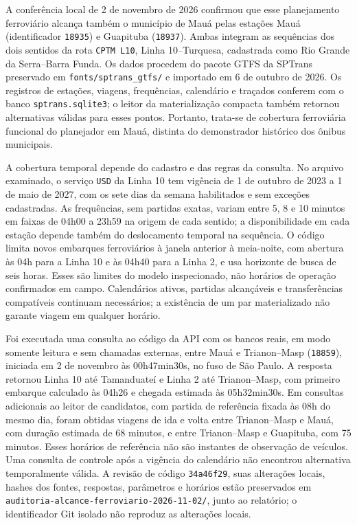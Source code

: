 \documentclass[12pt,oneside,a4paper,brazil,chapter=TITLE]{abntex2}
\begin{document}
A conferência local de 2 de novembro de 2026 confirmou que esse planejamento ferroviário alcança também o município de Mauá pelas estações Mauá (identificador \texttt{18935}) e Guapituba (\texttt{18937}). Ambas integram as sequências dos dois sentidos da rota \texttt{CPTM L10}, Linha 10--Turquesa, cadastrada como Rio Grande da Serra--Barra Funda. Os dados procedem do pacote GTFS da SPTrans preservado em \nolinkurl{fonts/sptrans_gtfs/} e importado em 6 de outubro de 2026. Os registros de estações, viagens, frequências, calendário e traçados conferem com o banco \nolinkurl{sptrans.sqlite3}; o leitor da materialização compacta também retornou alternativas válidas para esses pontos. Portanto, trata-se de cobertura ferroviária funcional do planejador em Mauá, distinta do demonstrador histórico dos ônibus municipais.

A cobertura temporal depende do cadastro e das regras da consulta. No arquivo examinado, o serviço \texttt{USD} da Linha 10 tem vigência de 1 de outubro de 2023 a 1 de maio de 2027, com os sete dias da semana habilitados e sem exceções cadastradas. As frequências, sem partidas exatas, variam entre 5, 8 e 10 minutos em faixas de 04h00 a 23h59 na origem de cada sentido; a disponibilidade em cada estação depende também do deslocamento temporal na sequência. O código limita novos embarques ferroviários à janela anterior à meia-noite, com abertura às 04h para a Linha 10 e às 04h40 para a Linha 2, e usa horizonte de busca de seis horas. Esses são limites do modelo inspecionado, não horários de operação confirmados em campo. Calendários ativos, partidas alcançáveis e transferências compatíveis continuam necessários; a existência de um par materializado não garante viagem em qualquer horário.

Foi executada uma consulta ao código da API com os bancos reais, em modo somente leitura e sem chamadas externas, entre Mauá e Trianon--Masp (\texttt{18859}), iniciada em 2 de novembro às 00h47min30s, no fuso de São Paulo. A resposta retornou Linha 10 até Tamanduateí e Linha 2 até Trianon--Masp, com primeiro embarque calculado às 04h26 e chegada estimada às 05h32min30s. Em consultas adicionais ao leitor de candidatos, com partida de referência fixada às 08h do mesmo dia, foram obtidas viagens de ida e volta entre Trianon--Masp e Mauá, com duração estimada de 68 minutos, e entre Trianon--Masp e Guapituba, com 75 minutos. Esses horários de referência não são instantes de observação de veículos. Uma consulta de controle após a vigência do calendário não encontrou alternativa temporalmente válida. A revisão de código \texttt{34a46f29}, suas alterações locais, hashes dos fontes, respostas, parâmetros e horários estão preservados em \nolinkurl{auditoria-alcance-ferroviario-2026-11-02/}, junto ao relatório; o identificador Git isolado não reproduz as alterações locais.
\end{document}
